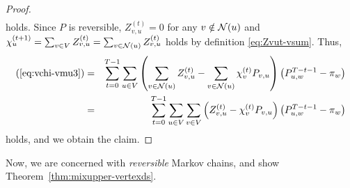 \documentclass[letter, 11pt]{article}
\newcommand{\1}{\mbox{1}\hspace{-0.25em}\mbox{l}}
\begin{document}
\begin{proof}
\begin{eqnarray}
\label{eq:vchi-vmu3}
\end{eqnarray}
 holds. 
Since $P$ is reversible, $Z_{v, u}^{(t)}=0$ for any $v \notin {\cal N}(u)$ and 
$\chi_u^{(t+1)} = \sum_{v \in V} Z_{v, u}^{(t)} = \sum_{v \in {\cal N}(u)} Z_{v, u}^{(t)}$ holds by definition \eqref{eq:Zvut-vsum}. 
Thus, 
\begin{eqnarray*}
(\ref{eq:vchi-vmu3})
&=&
 \sum_{t=0}^{T-1}\sum_{u\in V}
  \left(\sum_{v\in {\cal N}(u)} Z_{v, u}^{(t)} - \sum_{v\in {\cal N}(u)}\chi_v^{(t)}P_{v, u}\right) 
  \left( P^{T-t-1}_{u, w}-\pi_w \right) \\
&=&
 \sum_{t=0}^{T-1}\sum_{u\in V}\sum_{v\in V}
 \left( Z_{v, u}^{(t)}-\chi_v^{(t)}P_{v, u}\right) \left( P^{T-t-1}_{u, w}-\pi_w \right) 
\end{eqnarray*}
holds, and we obtain the claim.
\end{proof}
Now, we are concerned with {\em reversible} Markov chains, 
and show Theorem~\ref{thm:mixupper-vertexds}. 
\end{document}
